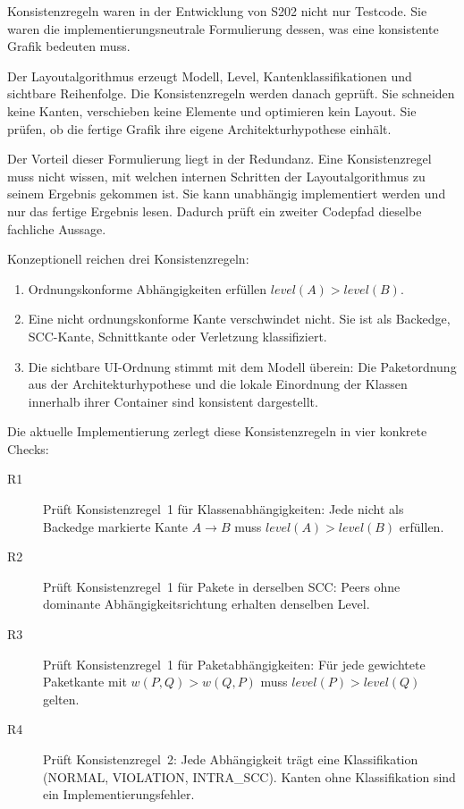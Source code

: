 \documentclass[a4paper,11pt]{article}
\begin{document}
Konsistenzregeln waren in der Entwicklung von S202 nicht nur Testcode. Sie waren
die implementierungsneutrale Formulierung dessen, was eine konsistente Grafik
bedeuten muss.

Der Layoutalgorithmus erzeugt Modell, Level, Kantenklassifikationen und
sichtbare Reihenfolge. Die Konsistenzregeln werden danach gepr\"uft. Sie
schneiden keine Kanten, verschieben keine Elemente und optimieren kein Layout.
Sie pr\"ufen, ob die fertige Grafik ihre eigene Architekturhypothese einh\"alt.

Der Vorteil dieser Formulierung liegt in der Redundanz. Eine Konsistenzregel muss
nicht wissen, mit welchen internen Schritten der Layoutalgorithmus zu seinem
Ergebnis gekommen ist. Sie kann unabh\"angig implementiert werden und nur das
fertige Ergebnis lesen. Dadurch pr\"uft ein zweiter Codepfad dieselbe fachliche
Aussage.

Konzeptionell reichen drei Konsistenzregeln:

\begin{enumerate}
  \item Ordnungskonforme Abh\"angigkeiten erf\"ullen
        $level(A) > level(B)$.
  \item Eine nicht ordnungskonforme Kante verschwindet nicht. Sie ist als
        Backedge, SCC-Kante, Schnittkante oder Verletzung klassifiziert.
  \item Die sichtbare UI-Ordnung stimmt mit dem Modell \"uberein: Die
        Paketordnung aus der Architekturhypothese und die lokale Einordnung
        der Klassen innerhalb ihrer Container sind konsistent dargestellt.
\end{enumerate}

Die aktuelle Implementierung zerlegt diese Konsistenzregeln in vier konkrete
Checks:

\begin{description}
  \item[R1] Pr\"uft Konsistenzregel~1 f\"ur Klassenabh\"angigkeiten: Jede
        nicht als Backedge markierte Kante $A \to B$ muss
        $level(A) > level(B)$ erf\"ullen.
  \item[R2] Pr\"uft Konsistenzregel~1 f\"ur Pakete in derselben SCC: Peers
        ohne dominante Abh\"angigkeitsrichtung erhalten denselben Level.
  \item[R3] Pr\"uft Konsistenzregel~1 f\"ur Paketabh\"angigkeiten: F\"ur jede
        gewichtete Paketkante mit $w(P,Q) > w(Q,P)$ muss
        $level(P) > level(Q)$ gelten.
  \item[R4] Pr\"uft Konsistenzregel~2: Jede Abh\"angigkeit tr\"agt eine
        Klassifikation (NORMAL, VIOLATION, INTRA\_SCC). Kanten ohne
        Klassifikation sind ein Implementierungsfehler.
\end{description}
\end{document}
